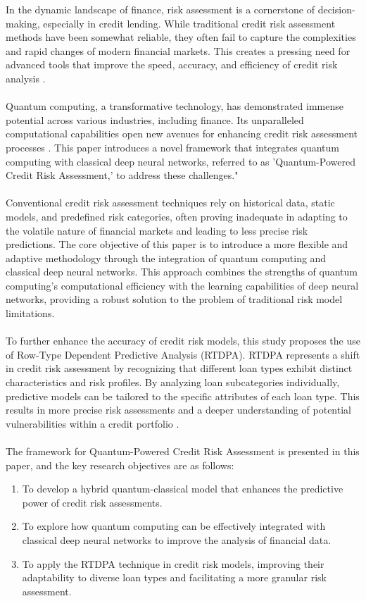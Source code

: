 \documentclass[a4paper]{article}
\begin{document}
\noindent In the dynamic landscape of finance, risk assessment is a cornerstone of decision-making, especially in credit lending. While traditional credit risk assessment methods have been somewhat reliable, they often fail to capture the complexities and rapid changes of modern financial markets. This creates a pressing need for advanced tools that improve the speed, accuracy, and efficiency of credit risk analysis \cite{Shi2022}.\\\\Quantum computing, a transformative technology, has demonstrated immense potential across various industries, including finance. Its unparalleled computational capabilities open new avenues for enhancing credit risk assessment processes \cite{Nielsen2000}. This paper introduces a novel framework that integrates quantum computing with classical deep neural networks, referred to as 'Quantum-Powered Credit Risk Assessment,' to address these challenges."\\\\Conventional credit risk assessment techniques rely on historical data, static models, and predefined risk categories, often proving inadequate in adapting to the volatile nature of financial markets and leading to less precise risk predictions. The core objective of this paper is to introduce a more flexible and adaptive methodology through the integration of quantum computing and classical deep neural networks. This approach combines the strengths of quantum computing’s computational efficiency with the learning capabilities of deep neural networks, providing a robust solution to the problem of traditional risk model limitations.\\\\To further enhance the accuracy of credit risk models, this study proposes the use of Row-Type Dependent Predictive Analysis (RTDPA). RTDPA represents a shift in credit risk assessment by recognizing that different loan types exhibit distinct characteristics and risk profiles. By analyzing loan subcategories individually, predictive models can be tailored to the specific attributes of each loan type. This results in more precise risk assessments and a deeper understanding of potential vulnerabilities within a credit portfolio \cite{rath2023adaptivemodellingapproachrowtype}.\\\\The framework for Quantum-Powered Credit Risk Assessment is presented in this paper, and the key research objectives are as follows:
\begin{enumerate}
	\item To develop a hybrid quantum-classical model that enhances the predictive power of credit risk assessments.
	\item To explore how quantum computing can be effectively integrated with classical deep neural networks to improve the analysis of financial data.
	\item To apply the RTDPA technique in credit risk models, improving their adaptability to diverse loan types and facilitating a more granular risk assessment.
\end{enumerate}
\end{document}

